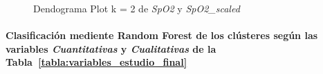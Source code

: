 \begin{figure}[ht]
    \centering
    \hfill
    \caption{Dendograma Plot k = 2 de \textit{SpO2} y \textit{SpO2\_scaled}}\label{fig:per_ctg_spo2}
\end{figure}

\paragraph{Clasificación mediente Random Forest de los clústeres según las variables \textit{Cuantitativas} y \textit{Cualitativas} de la Tabla~\ref{tabla:variables_estudio_final}}

